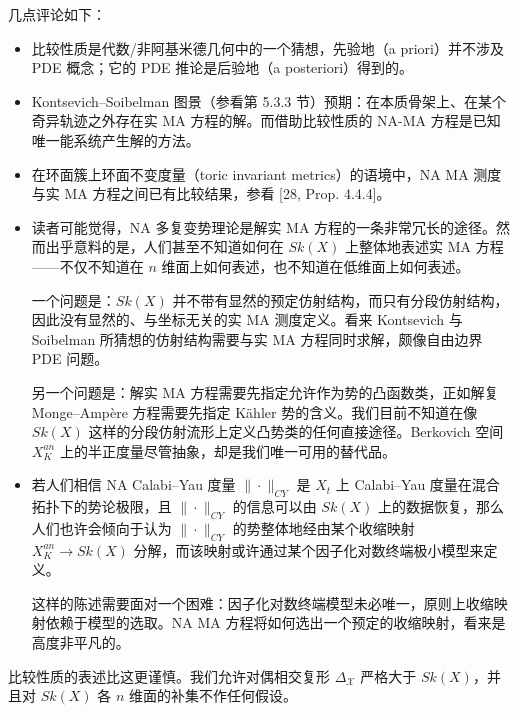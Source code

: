 几点评论如下：
\begin{itemize}
\item 比较性质是代数/非阿基米德几何中的一个猜想，先验地（a priori）并不涉及 PDE 概念；它的 PDE 推论是后验地（a posteriori）得到的。
\item Kontsevich--Soibelman 图景（参看第 5.3.3 节）预期：在本质骨架上、在某个奇异轨迹之外存在实 MA 方程的解。而借助比较性质的 NA-MA 方程是已知唯一能系统产生解的方法。
\item 在环面簇上环面不变度量（toric invariant metrics）的语境中，NA MA 测度与实 MA 方程之间已有比较结果，参看 [28, Prop. 4.4.4]。
\item 读者可能觉得，NA 多复变势理论是解实 MA 方程的一条非常冗长的途径。然而出乎意料的是，人们甚至不知道如何在 $Sk(X)$ 上整体地表述实 MA 方程------不仅不知道在 $n$ 维面上如何表述，也不知道在低维面上如何表述。

一个问题是：$Sk(X)$ 并不带有显然的预定仿射结构，而只有分段仿射结构，因此没有显然的、与坐标无关的实 MA 测度定义。看来 Kontsevich 与 Soibelman 所猜想的仿射结构需要与实 MA 方程同时求解，颇像自由边界 PDE 问题。

另一个问题是：解实 MA 方程需要先指定允许作为势的凸函数类，正如解复 Monge--Ampère 方程需要先指定 Kähler 势的含义。我们目前不知道在像 $Sk(X)$ 这样的分段仿射流形上定义凸势类的任何直接途径。Berkovich 空间 $X_K^{an}$ 上的半正度量尽管抽象，却是我们唯一可用的替代品。
\item 若人们相信 NA Calabi--Yau 度量 $\|\cdot\|_{CY}$ 是 $X_t$ 上 Calabi--Yau 度量在混合拓扑下的势论极限，且 $\|\cdot\|_{CY}$ 的信息可以由 $Sk(X)$ 上的数据恢复，那么人们也许会倾向于认为 $\|\cdot\|_{CY}$ 的势整体地经由某个收缩映射 $X_K^{an}\to Sk(X)$ 分解，而该映射或许通过某个因子化对数终端极小模型来定义。

这样的陈述需要面对一个困难：因子化对数终端模型未必唯一，原则上收缩映射依赖于模型的选取。NA MA 方程将如何选出一个预定的收缩映射，看来是高度非平凡的。
\end{itemize}

比较性质的表述比这更谨慎。我们允许对偶相交复形 $\Delta_{\mathcal X}$ 严格大于 $Sk(X)$，并且对 $Sk(X)$ 各 $n$ 维面的补集不作任何假设。

